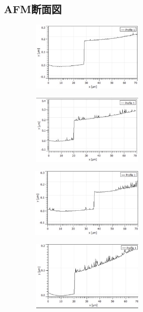 \documentclass{jsarticle}
\begin{document}
\subsection{AFM断面図}
\begin{figure}[htbp]
 \begin{minipage}{0.5\hsize}
  \begin{center}
   \includegraphics[width=70mm,height=35mm]{pictures/01.jpg}
  \end{center}
  \label{fig:one}
 \end{minipage}
 \begin{minipage}{0.5\hsize}
  \begin{center}
   \includegraphics[width=70mm,height=35mm]{pictures/02.jpg}
  \end{center}
  \label{fig:two}
 \end{minipage}
\end{figure}
\begin{figure}[htbp]
 \begin{minipage}{0.5\hsize}
  \begin{center}
   \includegraphics[width=70mm,height=35mm]{pictures/03.jpg}
  \end{center}
  \label{fig:one}
 \end{minipage}
 \begin{minipage}{0.5\hsize}
  \begin{center}
   \includegraphics[width=70mm,height=35mm]{pictures/04.jpg}
  \end{center}
  \label{fig:two}
 \end{minipage}
\end{figure}
\end{document}
